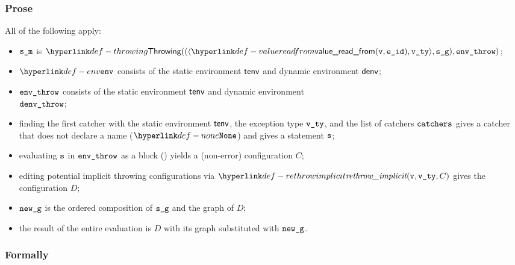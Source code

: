 \subsubsection{Prose}
All of the following apply:
\begin{itemize}
  \item $\sm$ is $\Throwing((\langle \valuereadfrom(\vv, \eid), \vvty \rangle, \sg), \envthrow)$;
  \item $\env$ consists of the static environment $\tenv$ and dynamic environment $\denv$;
  \item $\envthrow$ consists of the static environment $\tenv$ and dynamic environment \\ $\denvthrow$;
  \item finding the first catcher with the static environment $\tenv$, the exception type $\vvty$,
  and the list of catchers $\catchers$ gives a catcher that does not declare a name ($\None$) and gives a statement $\vs$;
  \item evaluating $\vs$ in $\envthrow$ as a block () yields a (non-error)
        configuration $C$\ProseOrError;
  \item editing potential implicit throwing configurations via $\rethrowimplicit(\vv, \vvty, C)$
        gives the configuration $D$;
  \item $\newg$ is the ordered composition of $\sg$ and the graph of $D$;
  \item the result of the entire evaluation is $D$ with its graph substituted with $\newg$.
\end{itemize}

\subsubsection{Formally}
\begin{mathpar}
\end{mathpar}

